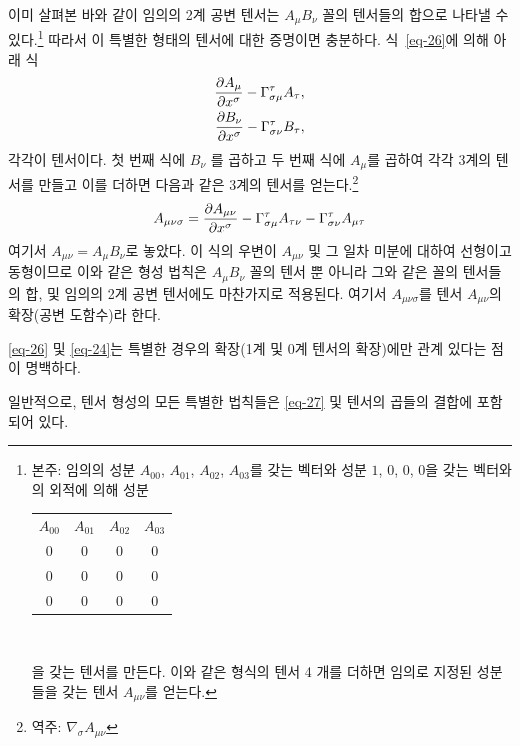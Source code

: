 \documentclass[b5paper]{article}
\begin{document}
이미 살펴본 바와 같이 임의의 2계 공변 텐서는 $A_\mu B_\nu$ 꼴의 텐서들의 합으로 나타낼 수 있다.\footnote{본주: 임의의 성분 $A_{0 0}$, $A_{0 1}$, $A_{0 2}$, $A_{0 3}$를 갖는 벡터와 성분 $1$, $0$, $0$, $0$을 갖는 벡터와의 외적에 의해 성분 

\hfill \begin{tabular}{cccc}
	$A_{0 0}$ & $A_{0 1}$ & $A_{0 2}$ & $A_{0 3}$\\
	0 & 0 & 0 & 0\\
	0 & 0 & 0 & 0\\
	0 & 0 & 0 & 0\\
\end{tabular} \hfill\,

\noindent 을 갖는 텐서를 만든다. 이와 같은 형식의 텐서 4 개를 더하면 임의로 지정된 성분들을 갖는 텐서  $A_{\mu\nu}$를 얻는다.} 따라서 이 특별한 형태의 텐서에 대한 증명이면 충분하다. 식~\eqref{eq-26}에 의해 아래 식
\begin{align*}
	{\frac{{\partial}{A_\mu}}{{\partial}{x^\sigma}}}  
	- \Gamma_{\sigma\mu}^\tau A_\tau, \\
	{\frac{{\partial}{B_\nu}}{{\partial}{x^\sigma}}}  
	- \Gamma_{\sigma\nu}^\tau B_\tau,
\end{align*}
각각이 텐서이다. 첫 번째 식에 $ B_\nu $ 를 곱하고 두 번째 식에 $ A_\mu $를 곱하여 각각 3계의 텐서를 만들고 이를 더하면 다음과 같은 3계의 텐서를 얻는다.\footnote{역주: $\nabla_\sigma A_{\mu\nu}$}
\begin{equation} \label{eq-27}
A_{\mu\nu\sigma} = {\frac{{\partial}{A_{\mu\nu}}}{{\partial}{x^\sigma}}}  
- \Gamma_{\sigma\mu}^\tau A_{\tau\nu} - \Gamma_{\sigma\nu}^\tau A_{\mu\tau}
\end{equation}
여기서 $A_{\mu\nu}=A_\mu B_\nu$로 놓았다. 이 식의 우변이 $A_{\mu\nu}$ 및 그 일차 미분에 대하여 선형이고 동형이므로 이와 같은 형성 법칙은 $A_\mu B_\nu$ 꼴의 텐서 뿐 아니라 그와 같은 꼴의 텐서들의 합, 및 임의의 2계 공변 텐서에도 마찬가지로 적용된다.
여기서 $A_{\mu\nu\sigma}$를 텐서 $A_{\mu\nu}$의 확장(공변 도함수)라 한다.

\eqref{eq-26} 및 \eqref{eq-24}는 특별한 경우의 확장(1계 및 0계 텐서의 확장)에만 관계 있다는 점이 명백하다.

일반적으로, 텐서 형성의 모든 특별한 법칙들은 \eqref{eq-27} 및 텐서의 곱들의 결합에 포함되어 있다. 
\end{document}
